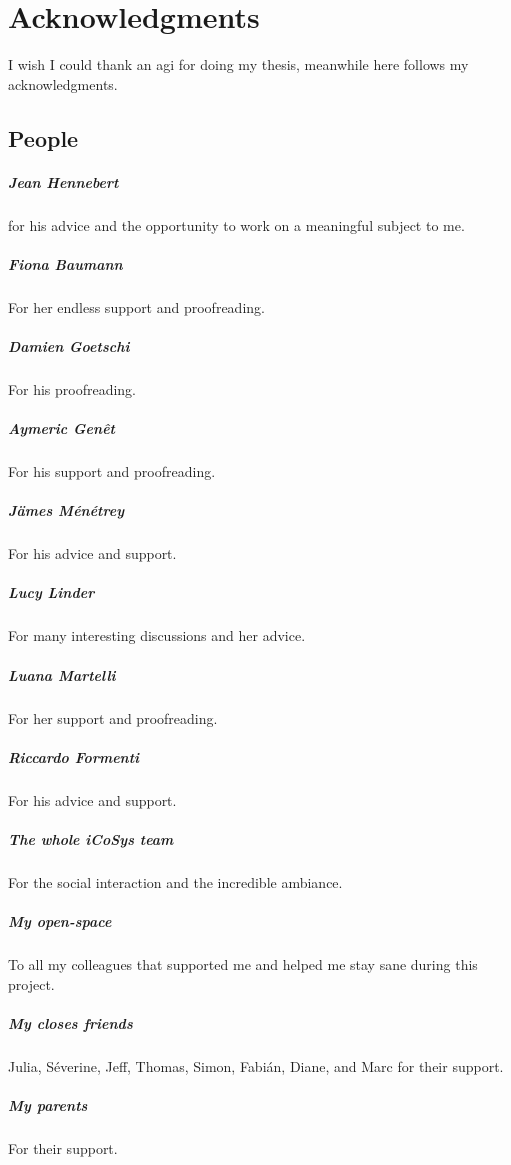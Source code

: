 \chapter*{Acknowledgments}

I wish I could thank an \gls{agi} for doing my thesis, meanwhile here follows my acknowledgments.

\section*{People}
\paragraph {Jean Hennebert} for his advice and the opportunity to work on a meaningful subject to me.
\paragraph {Fiona Baumann} For her endless support and proofreading.
\paragraph {Damien Goetschi} For his proofreading.
\paragraph {Aymeric Genêt} For his support and proofreading.
\paragraph {Jämes Ménétrey} For his advice and support.
\paragraph {Lucy Linder} For many interesting discussions and her advice.
\paragraph {Luana Martelli} For her support and proofreading.
\paragraph {Riccardo Formenti} For his advice and support.
\paragraph {The whole iCoSys team} For the social interaction and the incredible ambiance.
\paragraph {My open-space} To all my colleagues that supported me and helped me stay sane during this project.
\paragraph {My closes friends} Julia, Séverine, Jeff, Thomas, Simon, Fabián, Diane, and Marc for their support.
\paragraph {My parents} For their support.
